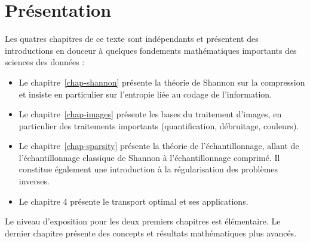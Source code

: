 
\chapter*{Présentation}

Les quatres chapitres de ce texte sont indépendants et présentent des introductions en douceur à quelques fondements mathématiques importants des sciences des données :
\begin{itemize}
	\item Le chapitre~\ref{chap-shannon} présente la théorie de Shannon sur la compression et insiste en particulier sur l'entropie liée au codage de l'information.
	\item Le chapitre~\ref{chap-images} présente les bases du traitement d'images, en particulier des traitements importants (quantification, débruitage, couleurs).
	\item Le chapitre~\ref{chap-sparsity} présente la théorie de l'échantillonnage, allant de l'échantillonnage classique de Shannon à l'échantillonnage comprimé. Il constitue également une introduction à la régularisation des problèmes inverses.
	\item Le chapitre 4 présente le transport optimal et ses applications.
\end{itemize}
Le niveau d'exposition pour les deux premiers chapitres est élémentaire. Le dernier chapitre présente des concepts et résultats mathématiques plus avancés.

\tableofcontents